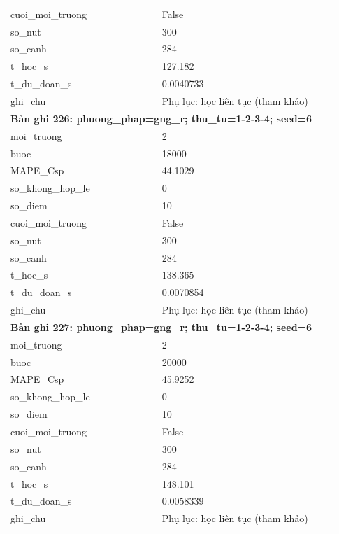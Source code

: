 \begin{longtable}{p{0.43\linewidth}p{0.50\linewidth}}
cuoi\_\allowbreak moi\_\allowbreak truong & False \\
so\_\allowbreak nut & 300 \\
so\_\allowbreak canh & 284 \\
t\_\allowbreak hoc\_\allowbreak s & 127.182 \\
t\_\allowbreak du\_\allowbreak doan\_\allowbreak s & 0.0040733 \\
ghi\_\allowbreak chu & Phụ lục: học liên tục (tham khảo) \\
\midrule
\multicolumn{2}{p{0.95\linewidth}}{\textbf{Bản ghi 226: phuong\_phap=gng\_r; thu\_tu=1-2-3-4; seed=6}} \\
moi\_\allowbreak truong & 2 \\
buoc & 18000 \\
MAPE\_\allowbreak Csp & 44.1029 \\
so\_\allowbreak khong\_\allowbreak hop\_\allowbreak le & 0 \\
so\_\allowbreak diem & 10 \\
cuoi\_\allowbreak moi\_\allowbreak truong & False \\
so\_\allowbreak nut & 300 \\
so\_\allowbreak canh & 284 \\
t\_\allowbreak hoc\_\allowbreak s & 138.365 \\
t\_\allowbreak du\_\allowbreak doan\_\allowbreak s & 0.0070854 \\
ghi\_\allowbreak chu & Phụ lục: học liên tục (tham khảo) \\
\midrule
\multicolumn{2}{p{0.95\linewidth}}{\textbf{Bản ghi 227: phuong\_phap=gng\_r; thu\_tu=1-2-3-4; seed=6}} \\
moi\_\allowbreak truong & 2 \\
buoc & 20000 \\
MAPE\_\allowbreak Csp & 45.9252 \\
so\_\allowbreak khong\_\allowbreak hop\_\allowbreak le & 0 \\
so\_\allowbreak diem & 10 \\
cuoi\_\allowbreak moi\_\allowbreak truong & False \\
so\_\allowbreak nut & 300 \\
so\_\allowbreak canh & 284 \\
t\_\allowbreak hoc\_\allowbreak s & 148.101 \\
t\_\allowbreak du\_\allowbreak doan\_\allowbreak s & 0.0058339 \\
ghi\_\allowbreak chu & Phụ lục: học liên tục (tham khảo) \\

\end{longtable}
